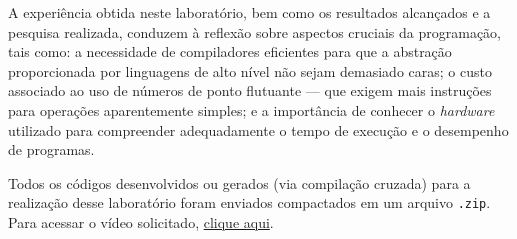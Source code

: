 \documentclass[a4paper,12pt]{article}
\newcommand{\cod}[1]{\texttt{#1}}
\begin{document}
A experiência obtida neste laboratório, bem como os resultados alcançados e a pesquisa realizada, conduzem à reflexão sobre aspectos cruciais da programação, tais como: a necessidade de compiladores eficientes para que a abstração proporcionada por linguagens de alto nível não sejam demasiado caras; o custo associado ao uso de números de ponto flutuante — que exigem mais instruções para operações aparentemente simples; e a importância de conhecer o \textit{hardware} utilizado para compreender adequadamente o tempo de execução e o desempenho de programas.

Todos os códigos desenvolvidos ou gerados (via compilação cruzada) para a realização desse laboratório foram enviados compactados em um arquivo \cod{.zip}. Para acessar o vídeo solicitado, \href{https://www.youtube.com/watch?v=0igjcjJHzPU}{clique aqui}.
\end{document}
